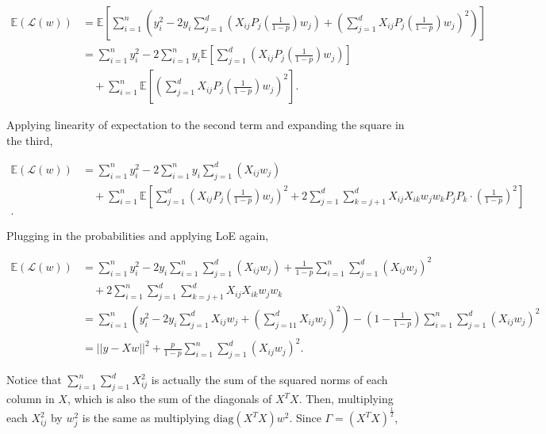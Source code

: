 \documentclass[answers]{exam}
\begin{document}
\begin{questions}
\begin{parts}
\begin{solution}
\begin{align*}
\mathbb{E}(\mathcal{L}(w)) &= \mathbb{E} \left[ \sum_{i=1}^{n}\left( y_{i}^2 - 2y_{i}\sum_{j=1}^{d}\left(X_{ij} P_{j} \left( \frac{1}{1-p} \right) w_{j}\right) + \left( \sum_{j=1}^{d} X_{ij}P_{j} \left(\frac{1}{1-p}\right) w_{j} \right)^2 \right)   \right] \\
&= \sum_{i=1}^{n} y_{i}^2 - 2\sum_{i=1}^{n}y_{i}\mathbb{E} \left[ \sum_{j=1}^{d}\left(X_{ij} P_{j} \left( \frac{1}{1-p} \right) w_{j}\right) \right] \\ 
    & \quad + \sum_{i=1}^{n}\mathbb{E} \left[ \left( \sum_{j=1}^{d} X_{ij}P_{j} \left( \frac{1}{1-p} \right) w_{j} \right)^2 \right].
\end{align*}

Applying linearity of expectation to the second term and expanding the square in
the third,

\begin{align*}
\mathbb{E}(\mathcal{L}(w))&= \sum_{i=1}^{n} y_{i}^2 - 2\sum_{i=1}^{n} y_{i}\sum_{j=1}^{d}(X_{ij} w_{j}) \\ 
    & \quad +\sum_{i=1}^{n}\mathbb{E} \left[ \sum_{j=1}^{d} \left(X_{ij}P_{j} \left( \frac{1}{1-p} \right)  w_{j}\right)^2 + 2\sum_{j=1}^{d} \sum_{k=j + 1}^{d} X_{ij}X_{ik}w_{j}w_{k}P_{j}P_{k} \cdot \left( \frac{1}{1-p} \right)^2 \right] \\
.\end{align*}

Plugging in the probabilities and applying LoE again,

\begin{align*}
\mathbb{E}(\mathcal{L}(w))&= \sum_{i=1}^{n} y_{i}^2 - 2y_{i}\sum_{i=1}^{n} \sum_{j=1}^{d}(X_{ij} w_{j}) + \frac{1}{1-p}\sum_{i=1}^{n} \sum_{j=1}^{d} (X_{ij}w_{j})^2 \\ 
    &\quad + 2\sum_{i=1}^{n}\sum_{j=1}^{d} \sum_{k=j + 1}^{d} X_{ij}X_{ik}w_{j}w_{k} \\ 
&= \sum_{i=1}^{n} \left( y_{i}^2 - 2y_{i}\sum_{j=1}^{d}X_{ij}w_{j} + \left( \sum_{j=11}^{d}X_{ij}w_{j} \right)^2 \right) - \left( 1 - \frac{1}{1-p} \right) \sum_{i=1}^{n}\sum_{j=1}^{d} (X_{ij}w_{j})^2 \\
&= ||y - Xw||^2 + \frac{p}{1-p} \sum_{i=1}^{n} \sum_{j=1}^{d} (X_{ij}w_{j})^2
.\end{align*}

Notice that $\sum_{i=1}^{n} \sum_{j=1}^{d} X_{ij}^2$ is actually the sum
of the squared norms of each column in $X$, which is also the sum of the diagonals
of $X^{T}X$. Then, multiplying each $X_{ij}^2$ by $w_{j}^2$ is the same as
multiplying $\text{diag}\left( X^{T}X \right) w^2$. Since $\Gamma = 
(X^{T}X)^{\frac{1}{2}}$,


\end{solution}
\end{parts}
\end{questions}
\end{document}
